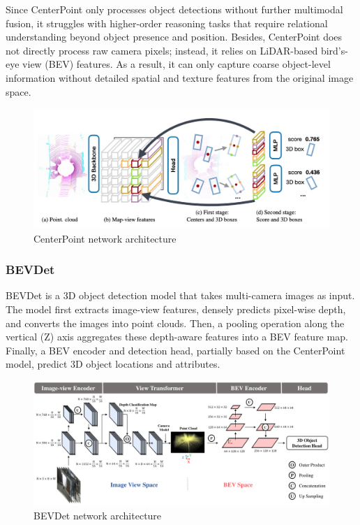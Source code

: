 \documentclass{article} %
\begin{document}
	Since CenterPoint only processes object detections without further multimodal fusion, it struggles with higher-order reasoning tasks that require relational understanding beyond object presence and position. Besides, CenterPoint does not directly process raw camera pixels; instead, it relies on LiDAR-based bird's-eye view (BEV) features. As a result, it can only capture coarse object-level information without detailed spatial and texture features from the original image space.
	
	\begin{figure}[H]
		\centering
		\includegraphics[width=0.75\linewidth]{Figures/centerpoint.jpg}
		\caption{CenterPoint network architecture}
		\label{fig:centerpoint}
	\end{figure}
	
	\subsubsection{BEVDet}
	BEVDet is a 3D object detection model that takes multi-camera images as input. The model first extracts image-view features, densely predicts pixel-wise depth, and converts the images into point clouds. Then, a pooling operation along the vertical (Z) axis aggregates these depth-aware features into a BEV feature map. Finally, a BEV encoder and detection head, partially based on the CenterPoint model, predict 3D object locations and attributes.
	\begin{figure}[H]
		\centering
		\includegraphics[width=0.75\linewidth]{Figures/bevdet.png}
		\caption{BEVDet network architecture}
		\label{fig:bevdet}
	\end{figure}
	
\end{document}
